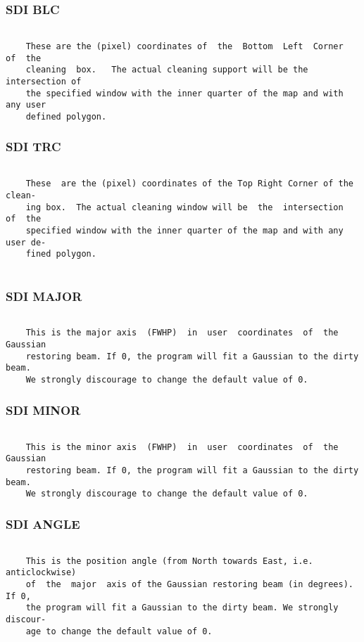 \subsubsection{SDI BLC}
\begin{verbatim}

    These are the (pixel) coordinates of  the  Bottom  Left  Corner  of  the
    cleaning  box.   The actual cleaning support will be the intersection of
    the specified window with the inner quarter of the map and with any user
    defined polygon.

\end{verbatim}
\subsubsection{SDI TRC}
\begin{verbatim}

    These  are the (pixel) coordinates of the Top Right Corner of the clean-
    ing box.  The actual cleaning window will be  the  intersection  of  the
    specified window with the inner quarter of the map and with any user de-
    fined polygon.


\end{verbatim}
\subsubsection{SDI MAJOR}
\begin{verbatim}

    This is the major axis  (FWHP)  in  user  coordinates  of  the  Gaussian
    restoring beam. If 0, the program will fit a Gaussian to the dirty beam.
    We strongly discourage to change the default value of 0.

\end{verbatim}
\subsubsection{SDI MINOR}
\begin{verbatim}

    This is the minor axis  (FWHP)  in  user  coordinates  of  the  Gaussian
    restoring beam. If 0, the program will fit a Gaussian to the dirty beam.
    We strongly discourage to change the default value of 0.

\end{verbatim}
\subsubsection{SDI ANGLE}
\begin{verbatim}

    This is the position angle (from North towards East, i.e. anticlockwise)
    of  the  major  axis of the Gaussian restoring beam (in degrees).  If 0,
    the program will fit a Gaussian to the dirty beam. We strongly  discour-
    age to change the default value of 0.

\end{verbatim}
